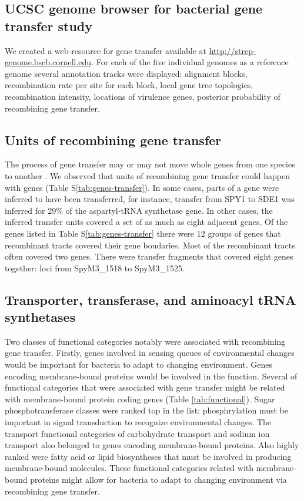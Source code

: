 \documentclass[english]{article}
\begin{document}
\subsection{UCSC genome browser for bacterial gene transfer study}

We created a web-resource for gene transfer available at
\url{http://strep-genome.bscb.cornell.edu}.  For each of the five individual
genomes as a reference genome several annotation tracks were displayed:
alignment blocks, recombination rate per site for each block, local gene tree
topologies, recombination intensity, locations of virulence genes, posterior
probability of recombining gene transfer.  

\subsection{Units of recombining gene transfer}

The process of gene transfer may or may not move whole genes from one species to
another \citep[e.g.,][]{Chan2009}. We observed that units of recombining gene
transfer could happen with genes (Table S\ref{tab:genes-transfer}). In some
cases, parts of a gene were inferred to have been transferred, for instance,
transfer from SPY1 to SDE1 was inferred for 29\% of the aspartyl-tRNA synthetase
gene.  In other cases, the inferred transfer units covered a set of as much as
eight adjacent genes.  Of the genes listed in Table S\ref{tab:genes-transfer}
there were 12 groups of genes that recombinant tracts covered their gene
boudaries.  Most of the recombinant tracts often covered two genes. There were
transfer fragments that covered eight genes together: loci from SpyM3\_1518 to
SpyM3\_1525.

\subsection{Transporter, transferase, and aminoacyl tRNA synthetases}

Two classes of functional categories notably were associated with recombining
gene transfer.  Firstly, genes involved in sensing queues of environmental
changes would be important for bacteria to adapt to changing environment.  Genes
encoding membrane-bound proteins would be involved in the function.  Several of
functional categories that were associated with gene transfer might be related
with membrane-bound protein coding genes (Table \ref{tab:functional}).  Sugar
phosphotransferase classes were ranked top in the list: phosphrylation must be
important in signal transduction to recognize environmental changes.  The
transport functional categories of carbohydrate transport and sodium ion
transport also belonged to genes encoding membrane-bound proteins.  Also highly
ranked were fatty acid or lipid biosyntheses that must be involved in producing
membrane-bound molecules. These functional categories related with
membrane-bound proteins might allow for bacteria to adapt to changing
environment via recombining gene transfer.
\end{document}
